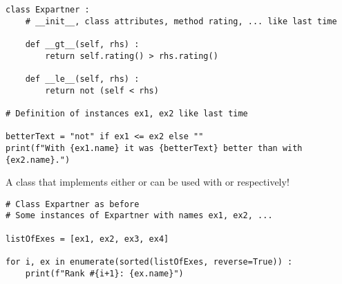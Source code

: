 
\begin{frame}[fragile]
%
\begin{codebox}
\begin{verbatim}
class Expartner :
    # __init__, class attributes, method rating, ... like last time
    
    def __gt__(self, rhs) :
        return self.rating() > rhs.rating()
    
    def __le__(self, rhs) :
        return not (self < rhs)

# Definition of instances ex1, ex2 like last time

betterText = "not" if ex1 <= ex2 else ""
print(f"With {ex1.name} it was {betterText} better than with {ex2.name}.")
\end{verbatim}
\end{codebox}
%
\end{frame}


\begin{frame}[fragile]
%
\begin{hintbox}
A class that implements either  or  can be used with  or  respectively!
\end{hintbox}
%
\begin{codebox}
\begin{verbatim}
# Class Expartner as before
# Some instances of Expartner with names ex1, ex2, ...

listOfExes = [ex1, ex2, ex3, ex4]

for i, ex in enumerate(sorted(listOfExes, reverse=True)) :
    print(f"Rank #{i+1}: {ex.name}")
\end{verbatim}
\end{codebox}
%
\end{frame}


